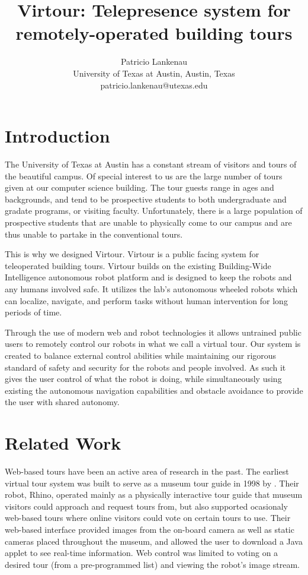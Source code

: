\documentclass[
  oneside,
  11pt, a4paper,
  footinclude=true,
  headinclude=true,
  cleardoublepage=empty
]{article}
\title{Virtour: Telepresence system for remotely-operated building tours}
\author{Patricio Lankenau\\
        University of Texas at Austin, Austin, Texas\\
        patricio.lankenau@utexas.edu\\}
\date{}
\begin{document}
\maketitle

\tableofcontents
\newpage

\section{Introduction}

The University of Texas at Austin has a constant stream of visitors and tours
of the beautiful campus. Of special interest to us are the large number of
tours given at our computer science building. The tour guests range in ages and
backgrounds, and tend to be prospective students to both undergraduate and
gradate programs, or visiting faculty. Unfortunately, there is a large
population of prospective students that are unable to physically come to our
campus and are thus unable to partake in the conventional tours.

This is why we designed Virtour. Virtour is a public facing system for
teleoperated building tours. Virtour builds on the existing Building-Wide
Intelligence autonomous robot platform and is designed to keep the robots and
any humans involved safe.  It utilizes the lab's autonomous wheeled robots
which can localize, navigate, and perform tasks without human intervention for
long periods of time.

Through the use of modern web and robot technologies it allows untrained public
users to remotely control our robots in what we call a virtual tour. Our system
is created to balance external control abilities while maintaining our rigorous
standard of safety and security for the robots and people involved. As such it
gives the user control of what the robot is doing, while simultaneously using
existing the autonomous navigation capabilities and obstacle avoidance to
provide the user with shared autonomy.

\section{Related Work}

Web-based tours have been an active area of research in the past. The earliest
virtual tour system was built to serve as a museum tour guide in 1998 by
\cite{burgard1998}. Their robot, Rhino, operated mainly as a physically
interactive tour guide that museum visitors could approach and request tours
from, but also supported ocasionaly web-based tours where online visitors could
vote on certain tours to use. Their web-based interface provided images from
the on-board camera as well as static cameras placed throughout the museum, and
allowed the user to download a Java applet to see real-time information. Web
control was limited to voting on a desired tour (from a pre-programmed list)
and viewing the robot's image stream.
\end{document}
